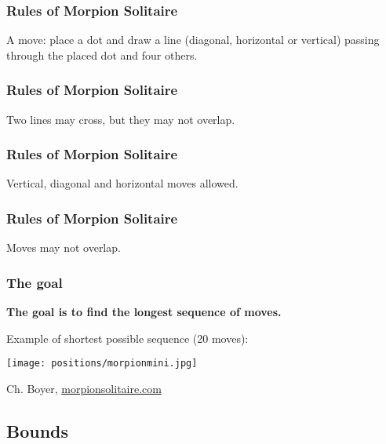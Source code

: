 \documentclass[pdftex]{beamer}
\begin{document}
\begin{frame}
\frametitle{Rules of Morpion Solitaire}
\begin{center}


A move: place a dot and draw a line (diagonal, horizontal or vertical) passing through the placed dot and four others.
\end{center}
\end{frame}

\begin{frame}
\frametitle{Rules of Morpion Solitaire}
\begin{center}


Two lines may cross, but they may not overlap.
\end{center}
\end{frame}

\begin{frame}
\frametitle{Rules of Morpion Solitaire}
\begin{center}


Vertical, diagonal and horizontal moves allowed.
\end{center}
\end{frame}

\begin{frame}
\frametitle{Rules of Morpion Solitaire}
\begin{center}


Moves may not overlap.
\end{center}
\end{frame}

\begin{frame}
\frametitle{The goal}

{\bf The goal is to find the longest sequence of moves.}

\vspace{5mm}
Example of shortest possible sequence (20 moves):

\vspace{3mm}
\begin{center}
\texttt{[image: positions/morpionmini.jpg]}
\end{center}
\begin{flushright}
\footnotesize Ch. Boyer, \url{morpionsolitaire.com}
\end{flushright}
\end{frame}

\subsection{Bounds}
\end{document}
